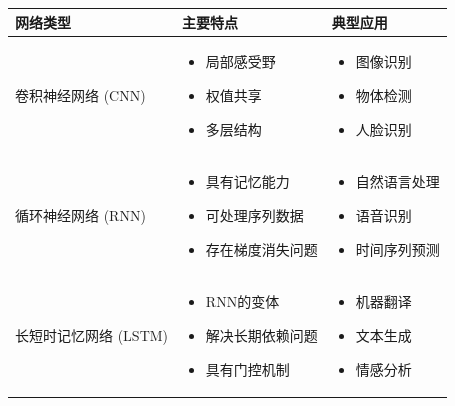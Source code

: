 \begin{table}[htbp]
    \centering
    \label{tab:example}
    \begin{tabular}{|l|p{5cm}|p{5cm}|}
        \hline
        \textbf{网络类型} & \textbf{主要特点} & \textbf{典型应用} \\
        \hline
        卷积神经网络 (CNN) &
        \begin{itemize}
            \item 局部感受野
            \item 权值共享
            \item 多层结构
        \end{itemize} &
        \begin{itemize}
            \item 图像识别
            \item 物体检测
            \item 人脸识别
        \end{itemize} \\
        \hline
        循环神经网络 (RNN) &
        \begin{itemize}
            \item 具有记忆能力
            \item 可处理序列数据
            \item 存在梯度消失问题
        \end{itemize} &
        \begin{itemize}
            \item 自然语言处理
            \item 语音识别
            \item 时间序列预测
        \end{itemize} \\
        \hline
        长短时记忆网络 (LSTM) &
        \begin{itemize}
            \item RNN的变体
            \item 解决长期依赖问题
            \item 具有门控机制
        \end{itemize} &
        \begin{itemize}
            \item 机器翻译
            \item 文本生成
            \item 情感分析
        \end{itemize} \\
        \hline
    \end{tabular}
\end{table}


